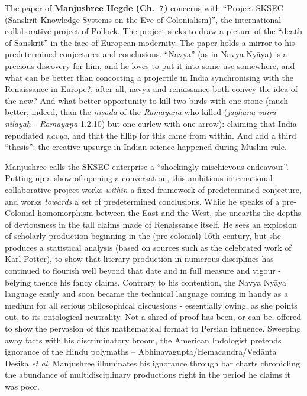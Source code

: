 The paper of {\bf Manjushree Hegde (Ch.~7)} concerns with “Project SKSEC (Sanskrit Knowledge Systems on the Eve of Colonialism)”, the international collaborative project of Pollock. The project seeks to draw a picture of the “death of Sanskrit” in the face of European modernity. The paper holds a mirror to his predetermined conjectures and conclusions. “Navya” (as in Navya Nyāya) is a precious discovery for him, and he loves to put it into some use somewhere, and what can be better than concocting a projectile in India synchronising with the Renaissance in Europe?; after all, navya and renaissance both convey the idea of the new? And what better opportunity to kill two birds with one stone (much better, indeed, than the {\sl niṣāda} of the {\sl Rāmāyaṇa} who killed ({\sl jaghāna vaira-nilayaḥ - Rāmāyaṇa} 1.2.10) but one curlew with one arrow): claiming that India repudiated {\sl navya}, and that the fillip for this came from within. And add a third “thesis”: the creative upsurge in Indian science happened during Muslim rule.

Manjushree calls the SKSEC enterprise a “shockingly mischievous endeavour”. Putting up a show of opening a conversation, this ambitious international collaborative project works {\sl within} a fixed framework of predetermined conjecture, and works {\sl towards} a set of predetermined conclusions. While he speaks of a pre-Colonial homomorphism between the East and the West, she unearths the depths of deviousness in the tall claims made of Renaissance itself. He sees an explosion of scholarly production beginning in the (pre-colonial) 16th century, but she produces a statistical analysis (based on sources such as the celebrated work of Karl Potter), to show that literary production in numerous disciplines has continued to flourish well beyond that date and in full measure and vigour - belying thence his fancy claims. Contrary to his contention, the Navya Nyāya language easily and soon became the technical language coming in handy as a medium for all serious philosophical discussions - essentially owing, as she points out, to its ontological neutrality. Not a shred of proof has been, or can be, offered to show the pervasion of this mathematical format to Persian influence. Sweeping away facts with his discriminatory broom, the American Indologist pretends ignorance of the Hindu polymaths -- Abhinavagupta/Hemacandra/Vedānta Deśika {\sl et al}. Manjushree illuminates his ignorance through bar charts chronicling the abundance of multidisciplinary productions right in the period he claims it was poor.

